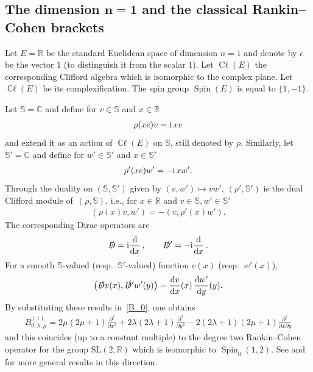 \documentclass[pdftex]{sigma}
\DeclareMathOperator{\cl}{C\ell} %
\DeclareMathOperator{\ccl}{\mathbb{C}\ell} %
\DeclareMathOperator{\Spin}{Spin}
\newcommand{\fsl}[1]{{\slashed{#1}}} %
\numberwithin{equation}{section}
\begin{document}
\subsection[The dimension n=1 and the classical Rankin--Cohen brackets]
{The dimension $\boldsymbol{n=1}$ and the classical Rankin--Cohen brackets}

Let $E=\mathbb R$ be the standard Euclidean space of dimension $n=1$ and denote by $e$ be the vector $1$ (to distinguish it from the scalar $1$). Let $\cl(E)$ the corresponding Clifford algebra which is isomorphic to the complex plane. Let $\ccl{(E)}$ be its complexification. The spin group $\Spin(E)$ is equal to $\{1,-1\}$.

Let $\mathbb S = \mathbb C$ and define for $v\in \mathbb S$ and $x\in \mathbb R$
\begin{gather*}
\rho(xe) v = {\rm i}\,xv
\end{gather*}
and extend it as an action of $\ccl(E)$ on $\mathbb S$, still denoted by $\rho$.
Similarly, let $\mathbb S'=\mathbb C$ and define for $w'\in \mathbb S'$ and $x \in \mathbb S'$
\begin{gather*}
\rho'(xe) w' = -{\rm i}\, xw'.
\end{gather*}
Through the duality on $(\mathbb S, \mathbb S') $ given by $(v,w')\mapsto vw'$, $(\rho',\mathbb S')$ is the dual Clifford module of~$(\rho, \mathbb S)$, i.e., for $x\in \mathbb R$ and $v\in \mathbb S, w'\in \mathbb S'$
\begin{gather*}
(\rho(x)v,w') = -(v,\rho'(x)w').
\end{gather*}
The corresponding Dirac operators are
\begin{gather*}
\fsl{D} = {\rm i} \frac{{\rm d}}{{\rm d} x}\,,\qquad
\fsl{D'} = -{\rm i} \frac{{\rm d}}{{\rm d} x}\, .
\end{gather*}
For a smooth $\mathbb S$-valued (resp.~$\mathbb S'$-valued) function $v(x)$ (resp.~$w'(x)$),
\begin{gather*}
\big(\fsl{D} v(x), \fsl{D'} w'(y)\big)= \frac{{\rm d}v}{{\rm d}x} (x)\,\frac{{\rm d}w'}{{\rm d}y}(y).
\end{gather*}
By substituting these results in~\eqref{B_0}, one obtains
\begin{gather}\label{B_0dim1}
B_{0;\lambda, \mu}^{(1)} = 2\mu(2\mu+1)\frac{\partial^2}{\partial x^2}+2\lambda(2\lambda+1) \frac{\partial^2}{\partial y^2}-2(2\lambda+1)(2\mu+1) \frac{\partial^2}{\partial x\partial y}
\end{gather}
and this coincides (up to a constant multiple) to the degree two Rankin--Cohen operator for the group $\mathrm{SL}(2,\mathbb R)$ which is isomorphic to $\Spin_0(1,2)$. See \cite[Theorem~10.7]{bck1} and~\cite{kp16} for more general results in this direction.
\end{document}
